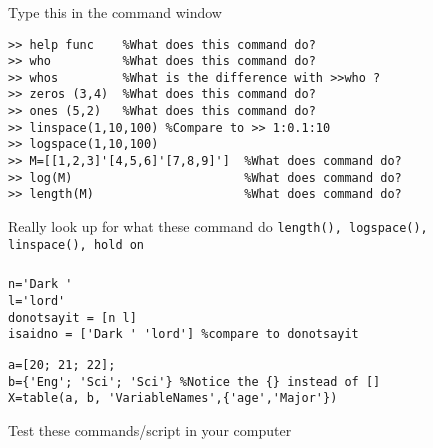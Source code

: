 \documentclass[11pt]{beamer}
\begin{document}
\begin{frame}[fragile]
\frametitle{\secname}

\begin{exampleblock}{Type this in the command window}
\begin{verbatim}
>> help func    %What does this command do?
>> who          %What does this command do?
>> whos         %What is the difference with >>who ?
>> zeros (3,4)  %What does this command do?
>> ones (5,2)   %What does this command do?
>> linspace(1,10,100) %Compare to >> 1:0.1:10
>> logspace(1,10,100)
>> M=[[1,2,3]'[4,5,6]'[7,8,9]']  %What does command do?
>> log(M)                        %What does command do?
>> length(M)                     %What does command do?
\end{verbatim}
\end{exampleblock}	
\begin{alertblock}{Really look up for what these command do}
	\verb|length(), logspace(), linspace(), hold on|
\end{alertblock}
	
\end{frame}

\begin{frame}[fragile]
	\frametitle{\secname}
	
\begin{lstlisting}[caption = {Concatenating text}]
n='Dark '
l='lord'
donotsayit = [n l]
isaidno = ['Dark ' 'lord'] %compare to donotsayit
\end{lstlisting}

\begin{lstlisting}[caption = {Making Tables}]
a=[20; 21; 22];  
b={'Eng'; 'Sci'; 'Sci'} %Notice the {} instead of [] 
X=table(a, b, 'VariableNames',{'age','Major'})
\end{lstlisting}

\begin{block}{}
	Test these commands/script in your computer
\end{block}

\end{frame}
\end{document}
